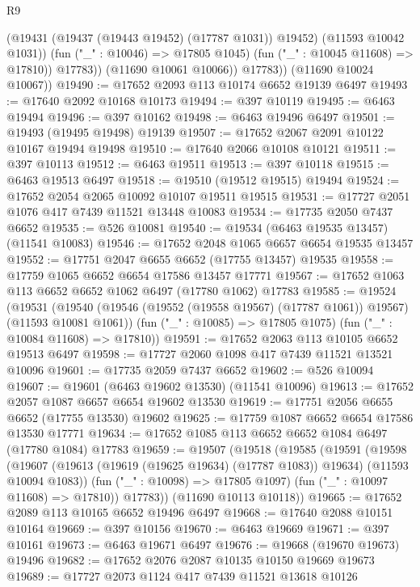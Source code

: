 \begin{lexlean}{R9}
\begin{coremodule}
                    (@19431 (@19437 (@19443 @19452) (@17787 @1031)) @19452)
                    (@11593 @10042 @1031))
                  (fun ("_" : @10046) => @17805 @1045)
                  (fun ("_" : @10045 @11608) => @17810))
                @17783))
            (@11690 @10061 @10066))
          @17783))
      (@11690 @10024 @10067))
@19490 := @17652 @2093 @113 @10174 @6652 @19139 @6497
@19493 := @17640 @2092 @10168 @10173
@19494 := @397 @10119
@19495 := @6463 @19494
@19496 := @397 @10162
@19498 := @6463 @19496 @6497
@19501 := @19493 (@19495 @19498) @19139
@19507 := @17652 @2067 @2091 @10122 @10167 @19494 @19498
@19510 := @17640 @2066 @10108 @10121
@19511 := @397 @10113
@19512 := @6463 @19511
@19513 := @397 @10118
@19515 := @6463 @19513 @6497
@19518 := @19510 (@19512 @19515) @19494
@19524 := @17652 @2054 @2065 @10092 @10107 @19511 @19515
@19531 := @17727 @2051 @1076 @417 @7439 @11521 @13448 @10083
@19534 := @17735 @2050 @7437 @6652
@19535 := @526 @10081
@19540 := @19534 (@6463 @19535 @13457) (@11541 @10083)
@19546 := @17652 @2048 @1065 @6657 @6654 @19535 @13457
@19552 := @17751 @2047 @6655 @6652 (@17755 @13457) @19535
@19558 := @17759 @1065 @6652 @6654 @17586 @13457 @17771
@19567 := @17652 @1063 @113 @6652 @6652 @1062 @6497 (@17780 @1062) @17783
@19585 := @19524
    (@19531
      (@19540 (@19546 (@19552 (@19558 @19567) (@17787 @1061)) @19567) (@11593 @10081 @1061))
      (fun ("_" : @10085) => @17805 @1075)
      (fun ("_" : @10084 @11608) => @17810))
@19591 := @17652 @2063 @113 @10105 @6652 @19513 @6497
@19598 := @17727 @2060 @1098 @417 @7439 @11521 @13521 @10096
@19601 := @17735 @2059 @7437 @6652
@19602 := @526 @10094
@19607 := @19601 (@6463 @19602 @13530) (@11541 @10096)
@19613 := @17652 @2057 @1087 @6657 @6654 @19602 @13530
@19619 := @17751 @2056 @6655 @6652 (@17755 @13530) @19602
@19625 := @17759 @1087 @6652 @6654 @17586 @13530 @17771
@19634 := @17652 @1085 @113 @6652 @6652 @1084 @6497 (@17780 @1084) @17783
@19659 := @19507
    (@19518
      (@19585
        (@19591
          (@19598
            (@19607 (@19613 (@19619 (@19625 @19634) (@17787 @1083)) @19634) (@11593 @10094 @1083))
            (fun ("_" : @10098) => @17805 @1097)
            (fun ("_" : @10097 @11608) => @17810))
          @17783))
      (@11690 @10113 @10118))
@19665 := @17652 @2089 @113 @10165 @6652 @19496 @6497
@19668 := @17640 @2088 @10151 @10164
@19669 := @397 @10156
@19670 := @6463 @19669
@19671 := @397 @10161
@19673 := @6463 @19671 @6497
@19676 := @19668 (@19670 @19673) @19496
@19682 := @17652 @2076 @2087 @10135 @10150 @19669 @19673
@19689 := @17727 @2073 @1124 @417 @7439 @11521 @13618 @10126

\end{coremodule}
\end{lexlean}
